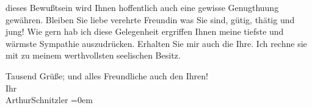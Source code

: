                dieses Bewußtsein wird Ihnen hoffentlich auch eine gewisse Genugthuung gewähren.
               Bleiben Sie liebe verehrte Freundin was Sie sind, gütig, {\pb}thätig und jung! Wie gern hab ich diese
               Gelegenheit ergriffen Ihnen meine tiefste und wärmste Sympathie auszudrücken.
               Erhalten Sie mir auch die Ihre. Ich rechne sie mit zu meinem werthvollsten seelischen
               Besitz.\pend
           
\pstart
           Tausend Grüße; und alles Freundliche auch den Ihren!{\\[\baselineskip]}Ihr{\\[\baselineskip]}\spacefill\mbox{ArthurSchnitzler}\pend
           \leftskip=0em{}\endnumbering{}
\begin{anhang}
\end{anhang}\newcommand{\dateiname}{L03984}\newcommand{\titel}{Arthur Schnitzler an Berta Zuckerkandl, 10. 8. 1929}\newcommand{\editorInnen}{Herausgegeben von Jahnke, SelmaMüller, Martin Anton}
